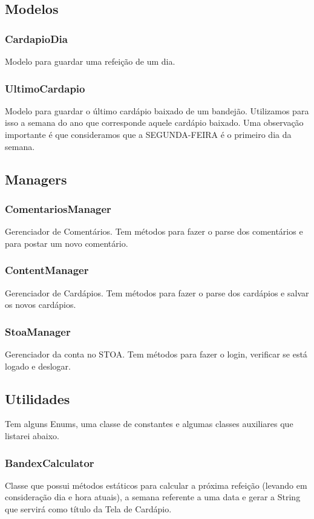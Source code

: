 \subsection{Modelos}
\subsubsection{CardapioDia}
Modelo para guardar uma refeição de um dia.

\subsubsection{UltimoCardapio}
Modelo para guardar o último cardápio baixado de um bandejão. Utilizamos para isso a semana do ano que corresponde aquele cardápio baixado. Uma observação importante é que consideramos que a SEGUNDA-FEIRA é o primeiro dia da semana.

\subsection{Managers}
\subsubsection{ComentariosManager}
Gerenciador de Comentários. Tem métodos para fazer o parse dos comentários e para postar um novo comentário.

\subsubsection{ContentManager}
Gerenciador de Cardápios. Tem métodos para fazer o parse dos cardápios e salvar os novos cardápios.

\subsubsection{StoaManager}
Gerenciador da conta no STOA. Tem métodos para fazer o login, verificar se está logado e deslogar.

\subsection{Utilidades}
Tem alguns Enums, uma classe de constantes e algumas classes auxiliares que listarei abaixo.
\subsubsection{BandexCalculator}
Classe que possui métodos estáticos para calcular a próxima refeição (levando em consideração dia e hora atuais), a semana referente a uma data e gerar a String que servirá como título da Tela de Cardápio.

